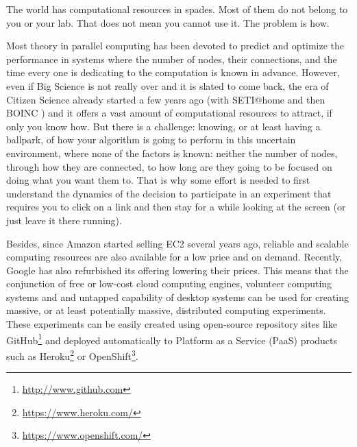\documentclass{sig-alternate}
\begin{document}
The world has computational resources in spades. Most of them do not
belong to you or your lab. That does not mean you cannot use it. The
problem is how. 

Most theory in parallel computing has been devoted to predict and
optimize the performance in systems where the number of nodes, their
connections, and the time every one is dedicating to the computation is
known in advance. However, even if Big Science is not really over and
it is slated to come back, the era of
Citizen Science already started a few years ago (with SETI@home \cite{david-seti:home} and then BOINC \cite{boinc_grid04}) and it
offers a vast amount of computational resources to attract, if only
you know how. But there is a challenge: knowing, or at least having a
ballpark, of how your algorithm is going to perform in this uncertain
environment, where none of the factors is known: neither the number of
nodes, through how they are connected, to how long are they going to
be focused on doing what you want them to. That is why some effort is
needed to first understand the dynamics of the decision to participate
in an experiment that requires you to click on a link and then stay
for a while looking at the screen (or just leave it there running).

Besides, since Amazon started selling EC2 several years ago, reliable
and scalable computing resources are also available for a low price
and on demand. Recently, Google has also refurbished its offering
lowering their prices. This means that the conjunction of free or
low-cost cloud computing engines, volunteer computing systems and and
untapped capability of desktop systems can be used for creating
massive, or at least potentially massive, distributed computing
experiments. These experiments can be easily created using open-source
repository sites like GitHub\footnote{\url{http://www.github.com}} and deployed automatically to Platform as
a Service (PaaS) products such as Heroku\footnote{\url{https://www.heroku.com/}} or OpenShift\footnote{\url{https://www.openshift.com/}}. 
\end{document}
